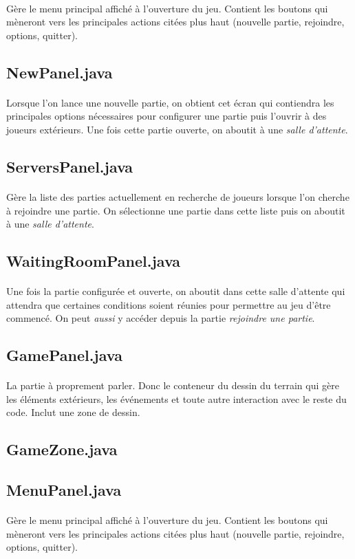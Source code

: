 \documentclass[a4paper,12pt]{report}
\begin{document}
\paragraph{}
Gère le menu principal affiché à l'ouverture du jeu. Contient les boutons qui mèneront vers les principales actions citées plus haut (nouvelle partie, rejoindre, options, quitter).
\subsection{NewPanel.java}
\paragraph{}
Lorsque l'on lance une nouvelle partie, on obtient cet écran qui contiendra les principales options nécessaires pour configurer une partie puis l'ouvrir à des joueurs extérieurs. Une fois cette partie ouverte, on aboutit à une \emph{salle d'attente}.
\subsection{ServersPanel.java}
\paragraph{}
Gère la liste des parties actuellement en recherche de joueurs lorsque l'on cherche à rejoindre une partie. On sélectionne une partie dans cette liste puis on aboutit à une \emph{salle d'attente}.
\subsection{WaitingRoomPanel.java}
\paragraph{}
Une fois la partie configurée et ouverte, on aboutit dans cette salle d'attente qui attendra que certaines conditions soient réunies pour permettre au jeu d'être commencé. On peut \emph{aussi} y accéder depuis la partie \emph{rejoindre une partie}.
\subsection{GamePanel.java}
\paragraph{}
La partie à proprement parler. Donc le conteneur du dessin du terrain qui gère les éléments extérieurs, les événements et toute autre interaction avec le reste du code. Inclut une zone de dessin.
\subsection{GameZone.java}
\paragraph{}

\subsection{MenuPanel.java}
\paragraph{}
Gère le menu principal affiché à l'ouverture du jeu. Contient les boutons qui mèneront vers les principales actions citées plus haut (nouvelle partie, rejoindre, options, quitter).
\end{document}
